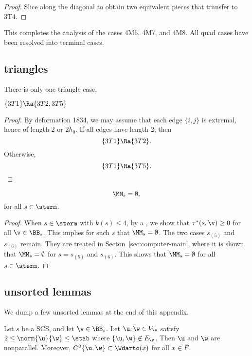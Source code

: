 \begin{proof} 
Slice along the diagonal to obtain two equivalent pieces that transfer to 3T4.
\end{proof}


This completes the analysis of the cases 4M6, 4M7, and 4M8.  
All quad cases have been resolved into terminal cases.



\subsection{triangles}


There is only one triangle case.

\begin{lemma}[]
$\{3T1\}\Ra \{3T2,3T5\}$
\end{lemma}

\begin{proof} By deformation 1834,  we may assume that each edge $\{i,j\}$ is extremal, hence
of length $2$ or $2h_0$.  If all edges have length $2$, then
\[
\{3T1\}\Ra\{3T2\}.
\]
Otherwise,
\[
\{3T1\}\Ra\{3T5\}.
\]
\end{proof}

\begin{lemma}\label{lemma:sterm-empty}
\[
\MM_s=\emptyset,
\]
for all $s\in\sterm$.
\end{lemma}

\begin{proof}
When $s\in \sterm$
with $k(s)\le 4$, by a , we show
that $\tau^*(s,\v) \ge0$ for all $\v\in \BB_s$.  This implies for such $s$
that $\MM_s=\emptyset$.  The two cases $s_{(5)}$ and $s_{(6)}$ remain.
They are treated in Secton~\ref{sec:computer-main}, where it is shown
that $\MM_s=\emptyset$ for $ s=s_{(5)}$ and $s_{(6)}$.  This
shows that $\MM_s=\emptyset$ for all $s\in \sterm$.
\end{proof}

\subsection{unsorted lemmas}

We dump a few unsorted lemmas at the end of this appendix.

\begin{lemma}[]\label{lemma:2hm-slice1}
Let $s$ be a SCS, and let $\v\in \BB_s$.
Let $\u,\w\in V_\v$ satisfy $2\le\norm{\u}{\w}\le \stab$ where
$\{\u,\w\}\not\in E_\v$.  Then $\u$ and $\w$ are nonparallel.
Moreover,
$C^0\{\u,\w\}\subset \Wdarto(x)$ for all $x\in F$.
\end{lemma}


